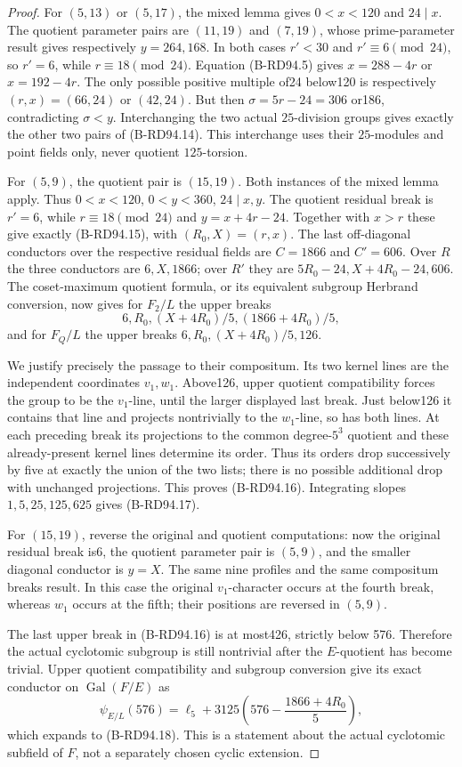 \begin{proof}
For $(5,13)$ or $(5,17)$, the mixed lemma gives $0<x<120$ and
$24\mid x$. The quotient parameter pairs are $(11,19)$ and
$(7,19)$, whose prime-parameter result gives respectively
$y=264,168$. In both cases $r'<30$ and $r'\equiv6\pmod{24}$,
so $r'=6$, while $r\equiv18\pmod{24}$. Equation (B-RD94.5)
gives $x=288-4r$ or $x=192-4r$. The only possible positive
multiple of24 below120 is respectively $(r,x)=(66,24)$ or
$(42,24)$. But then
$\sigma=5r-24=306$ or186, contradicting $\sigma<y$.
Interchanging the two actual $25$-division groups gives exactly
the other two pairs of (B-RD94.14). This interchange uses their
$25$-modules and point fields only, never quotient $125$-torsion.

For $(5,9)$, the quotient pair is $(15,19)$. Both instances of
the mixed lemma apply. Thus $0<x<120$, $0<y<360$,
$24\mid x,y$. The quotient residual break is $r'=6$, while
$r\equiv18\pmod{24}$ and $y=x+4r-24$. Together with $x>r$
these give exactly (B-RD94.15), with $(R_0,X)=(r,x)$.
The last off-diagonal conductors over the respective residual
fields are $C=1866$ and $C'=606$. Over $R$ the three conductors
are $6,X,1866$; over $R'$ they are
$5R_0-24,X+4R_0-24,606$.
The coset-maximum quotient formula, or its equivalent subgroup
Herbrand conversion, now gives for $F_2/L$ the upper breaks
\[
 6,R_0,(X+4R_0)/5,(1866+4R_0)/5,
\]
and for $F_Q/L$ the upper breaks
$6,R_0,(X+4R_0)/5,126$.

We justify precisely the passage to their compositum. Its two
kernel lines are the independent coordinates $v_1,w_1$.
Above126, upper quotient compatibility forces the group to be
the $v_1$-line, until the larger displayed last break. Just below126
it contains that line and projects nontrivially to the $w_1$-line,
so has both lines. At each preceding break its projections to the
common degree-$5^3$ quotient and these already-present kernel
lines determine its order. Thus its orders drop successively by
five at exactly the union of the two lists; there is no possible
additional drop with unchanged projections. This proves
(B-RD94.16). Integrating slopes $1,5,25,125,625$ gives (B-RD94.17).

For $(15,19)$, reverse the original and quotient computations:
now the original residual break is6, the quotient parameter pair
is $(5,9)$, and the smaller diagonal conductor is $y=X$.
The same nine profiles and the same compositum breaks result.
In this case the original $v_1$-character occurs at the fourth
break, whereas $w_1$ occurs at the fifth; their positions are
reversed in $(5,9)$.

The last upper break in (B-RD94.16) is at most426, strictly below
576. Therefore the actual cyclotomic subgroup is still nontrivial
after the $E$-quotient has become trivial. Upper quotient
compatibility and subgroup conversion give its exact conductor
on $\operatorname{Gal}(F/E)$ as
\[
 \psi_{E/L}(576)
 =\ell_5+3125\left(576-\frac{1866+4R_0}{5}\right),
\]
which expands to (B-RD94.18). This is a statement about the
actual cyclotomic subfield of $F$, not a separately chosen cyclic
extension.
\end{proof}

